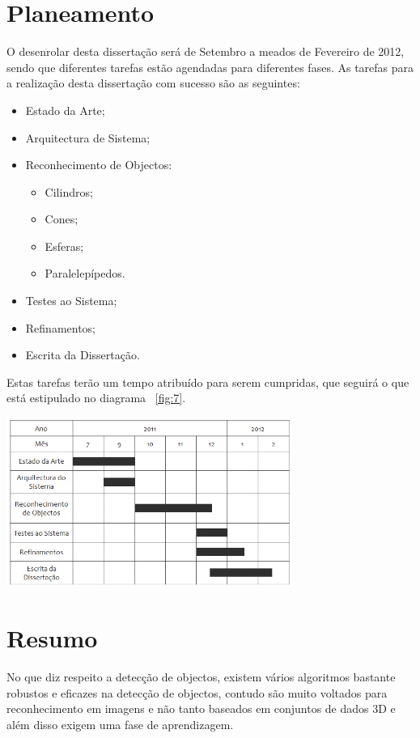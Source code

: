 \section{Planeamento}

O desenrolar desta dissertação será de Setembro a meados de Fevereiro de 2012, sendo
que diferentes tarefas estão agendadas para diferentes fases. As tarefas para a realização
desta dissertação com sucesso são as seguintes:
\begin{itemize}
\item Estado da Arte;
\item Arquitectura de Sistema;
\item Reconhecimento de Objectos:
\begin{itemize}
\item Cilindros;
\item Cones;
\item Esferas;
\item Paralelepípedos.
\end{itemize}
\item Testes ao Sistema;
\item Refinamentos;
\item Escrita da Dissertação.
\end{itemize}

Estas tarefas terão um tempo atribuído para serem cumpridas, que seguirá o que está estipulado no
diagrama ~\ref{fig:7}.

\begin{center}
	\includegraphics[width=0.70\textwidth]{figures/diss_timetable.PNG}
	\label{fig:7}
\end{center}

\section{Resumo}

No que diz respeito a detecção de objectos, existem vários algoritmos bastante robustos e
eficazes na detecção de objectos, contudo são muito voltados para reconhecimento em imagens 
e não tanto baseados em conjuntos de dados 3D e além disso exigem uma fase de aprendizagem.

